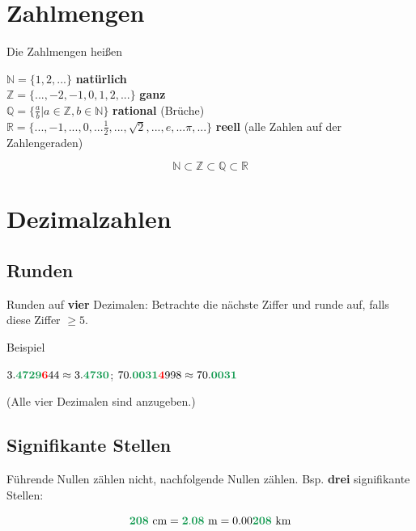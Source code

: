 \begin{multicols}{2}%

\section*{Zahlmengen}
\begin{definition*}{}{}
Die Zahlmengen heißen

$\mathbb{N} = \{1,2, ...\}$                                   \textbf{natürlich}\\
$\mathbb{Z} = \{..., -2, -1, 0, 1,2, ...\}$                   \textbf{ganz}\\
$\mathbb{Q} = \{\frac{a}b|a\in \mathbb{Z},b\in\mathbb{N}\}$   \textbf{rational} (Brüche)\\
$\mathbb{R} = \{..., -1, ..., 0, ... \frac12, ..., \sqrt{2}, ..., e, ... \pi, ...\}  $ \textbf{reell} (alle Zahlen auf der Zahlengeraden)\\
\end{definition*}

$$\mathbb{N} \subset \mathbb{Z} \subset \mathbb{Q} \subset \mathbb{R}$$

\hrulefill%

\section*{Dezimalzahlen}
\subsection*{Runden}
Runden auf \textbf{\color{ForestGreen}vier}  Dezimalen: Betrachte die nächste Ziffer und runde auf, falls diese {\color{red}Ziffer} $\ge 5$.

Beispiel

$3.\mathbf{\color{ForestGreen}4729}\mathbf{\color{red}6}44 \approx
3.\mathbf{\color{ForestGreen}4730}$; \hfill{ }
$70.\mathbf{\color{ForestGreen}0031}\mathbf{\color{red}4}998\approx
70.\mathbf{\color{ForestGreen}0031}$

(Alle vier Dezimalen sind anzugeben.)

\subsection*{Signifikante Stellen}
Führende Nullen zählen nicht, nachfolgende Nullen
zählen. Bsp. \textbf{\color{ForestGreen}drei} signifikante Stellen:

$$\mathbf{\color{ForestGreen}208} \textrm{ cm} = \mathbf{\color{ForestGreen}2.08} \textrm{ m} = 0.00\mathbf{\color{ForestGreen}208} \textrm{ km}$$


\end{multicols}
